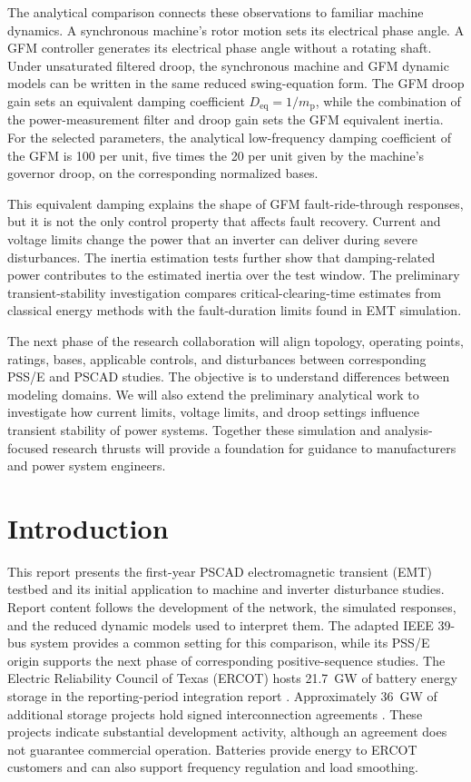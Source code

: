 \documentclass[11pt]{article}
\begin{document}
The analytical comparison connects these observations to familiar machine dynamics. A synchronous machine's rotor motion sets its electrical phase angle. A GFM controller generates its electrical phase angle without a rotating shaft. Under unsaturated filtered droop, the synchronous machine and GFM dynamic models can be written in the same reduced swing-equation form. The GFM droop gain sets an equivalent damping coefficient $D_{\mathrm{eq}}=1/m_{\mathrm{p}}$, while the combination of the power-measurement filter and droop gain sets the GFM equivalent inertia. For the selected parameters, the analytical low-frequency damping coefficient of the GFM is 100 per unit, five times the 20 per unit given by the machine's governor droop, on the corresponding normalized bases.

This equivalent damping explains the shape of GFM fault-ride-through responses, but it is not the only control property that affects fault recovery. Current and voltage limits change the power that an inverter can deliver during severe disturbances. The inertia estimation tests further show that damping-related power contributes to the estimated inertia over the test window. The preliminary transient-stability investigation compares critical-clearing-time estimates from classical energy methods with the fault-duration limits found in EMT simulation.

The next phase of the research collaboration will align topology, operating points, ratings, bases, applicable controls, and disturbances between corresponding PSS/E and PSCAD studies. The objective is to understand differences between modeling domains. We will also extend the preliminary analytical work to investigate how current limits, voltage limits, and droop settings influence transient stability of power systems. Together these simulation and analysis-focused research thrusts will provide a foundation for guidance to manufacturers and power system engineers.

\clearpage
\section{Introduction}

This report presents the first-year PSCAD electromagnetic transient (EMT) testbed and its initial application to machine and inverter disturbance studies. Report content follows the development of the network, the simulated responses, and the reduced dynamic models used to interpret them. The adapted IEEE 39-bus system provides a common setting for this comparison, while its PSS/E origin supports the next phase of corresponding positive-sequence studies.
The Electric Reliability Council of Texas (ERCOT) hosts 21.7~GW of battery energy storage in the reporting-period integration report \cite{esrint2026}. Approximately 36~GW of additional storage projects hold signed interconnection agreements \cite{gis2026}. These projects indicate substantial development activity, although an agreement does not guarantee commercial operation. Batteries provide energy to ERCOT customers and can also support frequency regulation and load smoothing.
\end{document}
